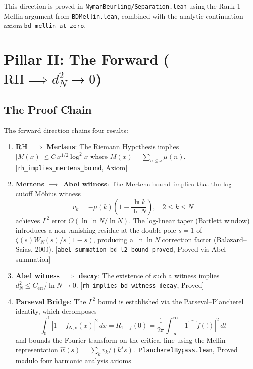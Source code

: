 \documentclass[11pt,a4paper]{article}
\theoremstyle{definition}
\newcommand{\RH}{\mathrm{RH}}
\newcommand{\lean}[1]{\texttt{#1}}
\begin{document}
This direction is proved in \lean{NymanBeurling/Separation.lean} using
the Rank-1 Mellin argument from \lean{BDMellin.lean}, combined with the
analytic continuation axiom \lean{bd\_mellin\_at\_zero}.

\section{Pillar II: The Forward ($\RH \implies d_N^2 \to 0$)}

\subsection{The Proof Chain}

The forward direction chains four results:

\begin{enumerate}
  \item \textbf{RH $\implies$ Mertens}: The Riemann Hypothesis implies
    $|M(x)| \leq C\,x^{1/2}\log^2 x$ where $M(x) = \sum_{n \leq x} \mu(n)$.
    [\lean{rh\_implies\_mertens\_bound}, Axiom]

  \item \textbf{Mertens $\implies$ Abel witness}: The Mertens bound
    implies that the log-cutoff M\"obius witness
    \[
      v_k = -\mu(k)\left(1 - \frac{\ln k}{\ln N}\right), \quad 2 \leq k \leq N
    \]
    achieves $L^2$ error $O(\ln\ln N/\ln N)$.
    The log-linear taper (Bartlett window) introduces a non-vanishing
    residue at the double pole $s=1$ of $\zeta(s)W_N(s)/s(1-s)$,
    producing a $\ln\ln N$ correction factor (Balazard--Saias, 2000).
    [\lean{abel\_summation\_bd\_l2\_bound\_proved}, Proved via Abel summation]

  \item \textbf{Abel witness $\implies$ decay}: The existence of such a
    witness implies $d_N^2 \leq C_{\mathrm{err}}/\ln N \to 0$.
    [\lean{rh\_implies\_bd\_witness\_decay}, Proved]

  \item \textbf{Parseval Bridge}: The $L^2$ bound is established via the
    Parseval--Plancherel identity, which decomposes
    \[
      \int_0^1 |1 - f_{N,v}(x)|^2\,dx
      = R_{1-f}(0)
      = \frac{1}{2\pi} \int_{-\infty}^{\infty} |\widehat{1-f}(t)|^2\,dt
    \]
    and bounds the Fourier transform on the critical line using the
    Mellin representation $\widehat{w}(s) = \sum_k v_k / (k^s s)$.
    [\lean{PlancherelBypass.lean}, Proved modulo four harmonic analysis axioms]
\end{enumerate}
\end{document}
